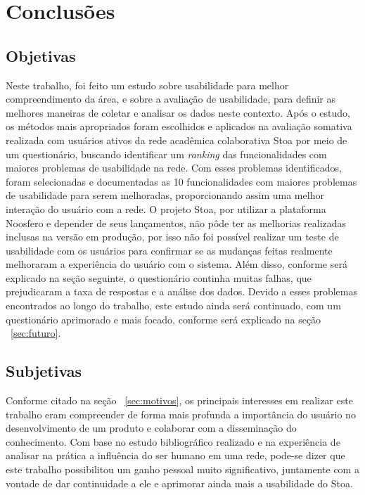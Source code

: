 \chapter{Conclusões}
\label{cap:conclusoes}

\section{Objetivas}
\label{sec:objetivas}

    Neste trabalho, foi feito um estudo sobre usabilidade para melhor compreendimento da área, e sobre a avaliação de usabilidade, para definir as melhores maneiras de coletar e analisar os dados neste contexto.
    Após o estudo, os métodos mais apropriados foram escolhidos  e aplicados na avaliação somativa realizada com usuários ativos da rede acadêmica colaborativa Stoa por meio de um questionário, buscando identificar um \emph{ranking} das funcionalidades com maiores problemas de usabilidade na rede. Com esses problemas identificados, foram selecionadas e documentadas as 10 funcionalidades com maiores problemas de usabilidade para serem melhoradas, proporcionando assim uma melhor interação do usuário com a rede.
    O projeto Stoa, por utilizar a plataforma Noosfero e depender de seus lançamentos, não pôde ter as melhorias realizadas inclusas na versão em produção, por isso não foi possível realizar um teste de usabilidade com os usuários para confirmar se as mudanças feitas realmente melhoraram a experiência do usuário com o sistema. Além disso, conforme será explicado na seção seguinte, o questionário continha muitas falhas, que prejudicaram a taxa de respostas e a análise dos dados. Devido a esses problemas encontrados ao longo do trabalho, este estudo ainda será continuado, com um questionário aprimorado e mais focado, conforme será explicado na seção ~\ref{sec:futuro}.
    
\section{Subjetivas}
\label{sec:subjetivas}

    Conforme citado na seção ~\ref{sec:motivos}, os principais interesses em realizar este trabalho eram compreender de forma mais profunda a importância do usuário no desenvolvimento de um produto e colaborar com a disseminação do conhecimento. Com base no estudo bibliográfico realizado e na experiência de analisar na prática a influência do ser humano em uma rede, pode-se dizer que este trabalho possibilitou um ganho pessoal muito significativo, juntamente com a vontade de dar continuidade a ele e aprimorar ainda mais a usabilidade do Stoa.
   
